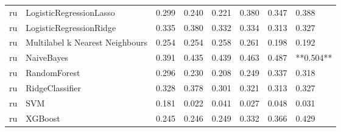 \begin{tabular}{llllllll}
      ru &         LogisticRegressionLasso & 0.299 &                     0.240 &                 0.221 &                  0.380 &                                   0.347 &     0.388 \\
      ru &         LogisticRegressionRidge & 0.335 &                     0.380 &                 0.332 &                  0.334 &                                   0.313 &     0.327 \\
      ru & Multilabel k Nearest Neighbours & 0.254 &                     0.254 &                 0.258 &                  0.261 &                                   0.198 &     0.192 \\
      ru &                      NaiveBayes & 0.391 &                     0.435 &                 0.439 &                  0.463 &                                   0.487 & **0.504** \\
      ru &                    RandomForest & 0.296 &                     0.230 &                 0.208 &                  0.249 &                                   0.337 &     0.318 \\
      ru &                 RidgeClassifier & 0.328 &                     0.378 &                 0.301 &                  0.321 &                                   0.313 &     0.327 \\
      ru &                             SVM & 0.181 &                     0.022 &                 0.041 &                  0.027 &                                   0.048 &     0.031 \\
      ru &                         XGBoost & 0.245 &                     0.246 &                 0.249 &                  0.332 &                                   0.366 &     0.429 \\
\bottomrule
\end{tabular}
